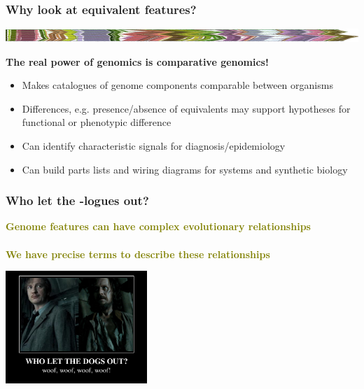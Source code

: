 \begin{frame}
  \frametitle{Why look at equivalent features?}
  \begin{center}
    \includegraphics[width=1\textwidth]{images/collinear_zeae}  
  \end{center}
  \textbf{The real power of genomics is comparative genomics!}
  \begin{itemize}
    \item Makes catalogues of genome components comparable between organisms
    \item Differences, e.g. presence/absence of equivalents may support hypotheses for functional or phenotypic difference
    \item Can identify characteristic signals for diagnosis/epidemiology
    \item Can build parts lists and wiring diagrams for systems and synthetic biology
  \end{itemize}
\end{frame}

%
\begin{frame}
  \frametitle{Who let the -logues out?}
  \Large{
    \textcolor{olive}{
      \textbf{
      Genome features can have complex evolutionary relationships \\~\\
      We have precise terms to describe these relationships
      }
    }
  }
  \begin{center}
    \includegraphics[width=0.4\textwidth]{images/who_let_the_dogs_out}
  \end{center}      
\end{frame}

